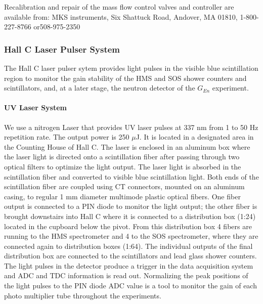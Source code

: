Recalibration and repair of the mass flow control valves and controller are
available from:  MKS instruments, Six Shattuck Road, Andover, MA 01810,  
1-800-227-8766 or508-975-2350



\subsubsection{Hall C Laser Pulser System}
The Hall C laser pulser sytem provides light pulses
in the visible  blue scintillation region to monitor
the gain stability of the HMS and SOS shower counters and scintillators,
and, at a later stage, the neutron detector of the $G_{En}$ experiment.

\paragraph{UV Laser System}
We use a nitrogen Laser that provides UV laser pulses at 337 nm
from 1 to 50 Hz repetition rate. The output power is 250 $\mu$J.
It is located in a designated area in the Counting House of Hall C.
The laser is enclosed in an aluminum box where the laser light is directed
onto a scintillation fiber after passing through two optical filters
to optimize the light output. 
The laser light is absorbed in the scintillation fiber
and converted to visible blue scintillation light. Both ends of the
scintillation fiber are coupled using CT connectors, mounted on an
aluminum casing, to regular
1 mm diameter multimode plastic optical fibers. One fiber output is
connected to a PIN diode to monitor the light output; the other
fiber is brought downstairs into Hall C where it is connected to 
a distribution box (1:24) located in the cupboard below the pivot. From
this distribution box 4 fibers are running to the HMS spectrometer and
4 to the SOS spectrometer, where they
are connected again to distribution boxes (1:64). The individual
outputs of the final distribution box are connected to the scintillators
and lead glass shower counters. The light pulses in the detector
produce a trigger in the data acquisition system and ADC and TDC
information is read out. Normalizing the peak positions of the light 
pulses to the PIN diode ADC value is a tool to monitor the gain of
each photo multiplier tube throughout the experiments.


